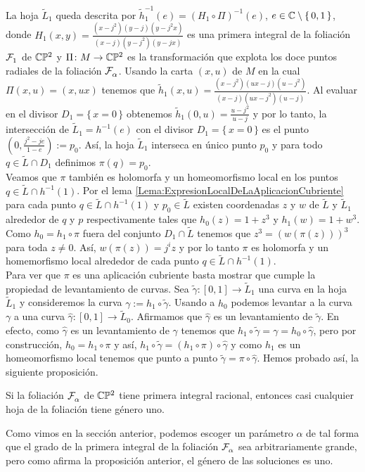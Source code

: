 La hoja $\tilde{L}_{1}$ queda descrita por $\tilde{h}_{1}^{-1}(e)=(H_{1}\circ\Pi)^{-1}(e)$, $e\in\mathbb{C}\setminus\{\, 0,1 \, \}$, donde $H_{1}(x,y)=\tfrac{(x-j^{2})(y-j)(y-j^{2}x)}{(x-j)(y-j^{2})(y-jx)}$ es una primera integral de la foliación $\mathcal{F}^{\ }_{1}$ de $\mathbb{C}\mathbb{P}^2$ y $\Pi\colon M\rightarrow \mathbb{C}\mathbb{P}^2$ es la transformación que explota los doce puntos radiales de la foliación $\mathcal{F}^{\ }_{\alpha}$. Usando la carta $(x,u)$ de $M$ en la cual $\Pi(x,u)=(x,ux)$ tenemos que $\tilde{h}_{1}(x,u)=\tfrac{(x-j^{2})(ux-j)(u-j^{2})}{(x-j)(ux-j^{2})(u-j)}$. Al evaluar en el divisor $D_{1}=\{\, x=0\, \}$ obtenemos $\tilde{h}_{1}(0,u)=\tfrac{u-j^{2}}{u-j}$ y por lo tanto, la intersección de $\tilde{L}_{1}=h^{-1}(e)$ con el divisor $D_{1}=\{\, x=0\, \}$ es el punto $(0,\tfrac{j^{2}-je}{1-e}):=p_{0}$. Así, la hoja $\tilde{L}_{1}$ interseca en único punto $p_{0}$ y para todo $q\in\tilde{L}\cap D_{1}$ definimos $\pi(q)=p_{0}$.\\

Veamos que $\pi$ también es holomorfa y un homeomorfismo local en los puntos $q\in\tilde{L}\cap h^{-1}(1)$. Por el lema \ref{Lema:ExpresionLocalDeLaAplicacionCubriente} para cada punto $q\in\tilde{L}\cap h^{-1}(1)$ y $p_{0}\in\tilde{L}$ existen coordenadas $z$ y $w$ de $\tilde{L}$ y $\tilde{L}_{1}$ alrededor de $q$ y $p$ respectivamente tales que $h_{0}(z)=1+z^{3}$ y $h_{1}(w)=1+w^{3}$. Como $h_{0}=h_{1}\circ\pi$ fuera del conjunto $D_{1}\cap\tilde{L}$ tenemos que $z^{3}=(w(\pi(z)))^{3}$ para toda $z\neq 0$. Así, $w(\pi(z))=j^{i}z$ y por lo tanto $\pi$ es holomorfa y un homemorfismo local alrededor de cada punto $q\in\tilde{L}\cap h^{-1}(1)$.\\

Para ver que $\pi$ es una aplicación cubriente basta mostrar que cumple la propiedad de levantamiento de curvas. Sea $\tilde{\gamma}\colon [0,1]\rightarrow\tilde{L}_{1}$ una curva en la hoja $\tilde{L}_{1}$ y consideremos la curva $\gamma:=h_{1}\circ\tilde{\gamma}$. Usando a $h_{0}$ podemos levantar a la curva $\gamma$ a una curva $\hat{\gamma}\colon [0,1]\rightarrow\tilde{L}_{0}$. Afirmamos que $\hat{\gamma}$ es un levantamiento de $\tilde{\gamma}$. En efecto, como $\hat{\gamma}$ es un levantamiento de $\gamma$ tenemos que $h_{1}\circ\tilde{\gamma}=\gamma=h_{0}\circ\hat{\gamma}$, pero por construcción, $h_{0}=h_{1}\circ\pi$ y así, $h_{1}\circ\tilde{\gamma}=(h_{1}\circ\pi)\circ\hat{\gamma}$ y como $h_{1}$ es un homeomorfismo local tenemos que punto a punto $\tilde{\gamma}=\pi\circ\hat{\gamma}$. Hemos probado así, la siguiente proposición.

\begin{Proposicion}
\label{Prop:GeneroDeLasSoluciones}
Si la foliación $\mathcal{F}^{\ }_{\alpha}$ de $\mathbb{C}\mathbb{P}^2$ tiene primera integral racional, entonces casi cualquier hoja de la foliación tiene género uno.
\end{Proposicion}

Como vimos en la sección anterior, podemos escoger un parámetro $\alpha$ de tal forma que el grado de la primera integral de la foliación $\mathcal{F}^{\ }_{\alpha}$ sea arbitrariamente grande, pero como afirma la proposición anterior, el género de las soluciones es uno.
